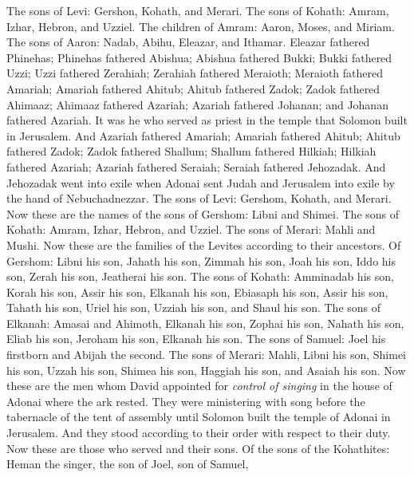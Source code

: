 \begin{biblechapter} %
\verse  The sons of Levi: Gershon, Kohath, and Merari.
\verse The sons of Kohath: Amram, Izhar, Hebron, and Uzziel.
\verse The children of Amram: Aaron, Moses, and Miriam. The sons of Aaron: Nadab, Abihu, Eleazar, and Ithamar.
\verse Eleazar fathered Phinehas; Phinehas fathered Abishua;
\verse Abishua fathered Bukki; Bukki fathered Uzzi;
\verse Uzzi fathered Zerahiah; Zerahiah fathered Meraioth;
\verse Meraioth fathered Amariah; Amariah fathered Ahitub;
\verse Ahitub fathered Zadok; Zadok fathered Ahimaaz;
\verse Ahimaaz fathered Azariah; Azariah fathered Johanan;
\verse and Johanan fathered Azariah. It was he who served as priest in the temple that Solomon built in Jerusalem.
\verse And Azariah fathered Amariah; Amariah fathered Ahitub;
\verse Ahitub fathered Zadok; Zadok fathered Shallum;
\verse Shallum fathered Hilkiah; Hilkiah fathered Azariah;
\verse Azariah fathered Seraiah; Seraiah fathered Jehozadak.
\verse And Jehozadak went into exile when Adonai sent Judah and Jerusalem into exile by the hand of Nebuchadnezzar.
 The sons of Levi: Gershom, Kohath, and Merari.
\verse Now these are the names of the sons of Gershom: Libni and Shimei.
\verse The sons of Kohath: Amram, Izhar, Hebron, and Uzziel.
\verse The sons of Merari: Mahli and Mushi. Now these are the families of the Levites according to their ancestors.
\verse Of Gershom: Libni his son, Jahath his son, Zimmah his son,
\verse Joah his son, Iddo his son, Zerah his son, Jeatherai his son.
\verse The sons of Kohath: Amminadab his son, Korah his son, Assir his son,
\verse Elkanah his son, Ebiasaph his son, Assir his son,
\verse Tahath his son, Uriel his son, Uzziah his son, and Shaul his son.
\verse The sons of Elkanah: Amasai and Ahimoth,
\verse Elkanah his son, Zophai his son, Nahath his son,
\verse Eliab his son, Jeroham his son, Elkanah his son.
\verse The sons of Samuel: Joel his firstborn and Abijah the second.
\verse The sons of Merari: Mahli, Libni his son, Shimei his son, Uzzah his son,
\verse Shimea his son, Haggiah his son, and Asaiah his son.
 Now these are the men whom David appointed for \textit{control of singing} in the house of Adonai where the ark rested.
\verse They were ministering with song before the tabernacle of the tent of assembly until Solomon built the temple of Adonai in Jerusalem. And they stood according to their order with respect to their duty.
\verse Now these are those who served and their sons. Of the sons of the Kohathites: Heman the singer, the son of Joel, son of Samuel,

\end{biblechapter}
